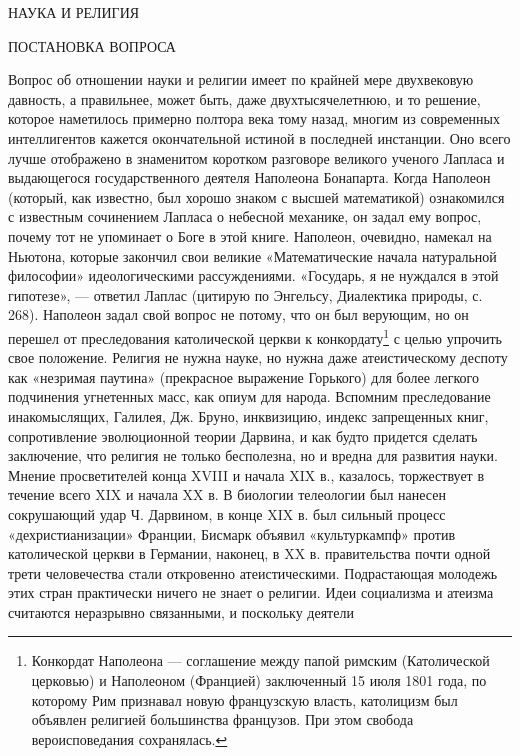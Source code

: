 НАУКА И РЕЛИГИЯ

ПОСТАНОВКА ВОПРОСА

Вопрос об отношении науки и  религии имеет по крайней мере двухвековую
давность,  а  правильнее,  может  быть, даже  двухтысячелетнюю,  и  то
решение, которое  наметилось примерно полтора века  тому назад, многим
из современных интеллигентов кажется окончательной истиной в последней
инстанции. Оно всего лучше  отображено в знаменитом коротком разговоре
великого  ученого  Лапласа   и  выдающегося  государственного  деятеля
Наполеона Бонапарта. Когда Наполеон (который, как известно, был хорошо
знаком  с  высшей  математикой)  ознакомился  с  известным  сочинением
Лапласа  о небесной  механике,  он  задал ему  вопрос,  почему тот  не
упоминает о Боге в этой книге. Наполеон, очевидно, намекал на Ньютона,
которые  закончил  свои  великие  «Математические  начала  натуральной
философии» идеологическими  рассуждениями. «Государь, я не  нуждался в
этой гипотезе»,  --- ответил  Лаплас (цитирую по  Энгельсу, Диалектика
природы, с.  268). Наполеон задал  свой вопрос  не потому, что  он был
верующим,  но  он  перешел  от  преследования  католической  церкви  к
конкордату\footnote{Конкордат  Наполеона  --- соглашение  между  папой
римским  (Католической церковью)  и Наполеоном  (Францией) заключенный
15  июля  1801  года,  по которому  Рим  признавал  новую  французскую
власть, католицизм  был объявлен  религией большинства  французов. При
этом  свобода  вероисповедания  сохранялась.} с  целью  упрочить  свое
положение.  Религия  не  нужна  науке, но  нужна  даже  атеистическому
деспоту  как «незримая  паутина» (прекрасное  выражение Горького)  для
более  легкого  подчинения  угнетенных  масс, как  опиум  для  народа.
Вспомним преследование инакомыслящих,  Галилея, Дж. Бруно, инквизицию,
индекс  запрещенных книг,  сопротивление эволюционной  теории Дарвина,
и  как  будто  придется  сделать заключение,  что  религия  не  только
бесполезна, но и вредна для развития науки. Мнение просветителей конца
XVIII и  начала XIX в.,  казалось, торжествует  в течение всего  XIX и
начала XX  в. В  биологии телеологии был  нанесен сокрушающий  удар Ч.
Дарвином,  в  конце  XIX  в. был  сильный  процесс  «дехристианизации»
Франции,  Бисмарк объявил  «культуркампф»  против католической  церкви
в  Германии,  наконец,  в  XX   в.  правительства  почти  одной  трети
человечества  стали откровенно  атеистическими. Подрастающая  молодежь
этих  стран практически  ничего не  знает о  религии. Идеи  социализма
и  атеизма  считаются  неразрывно   связанными,  и  поскольку  деятели
